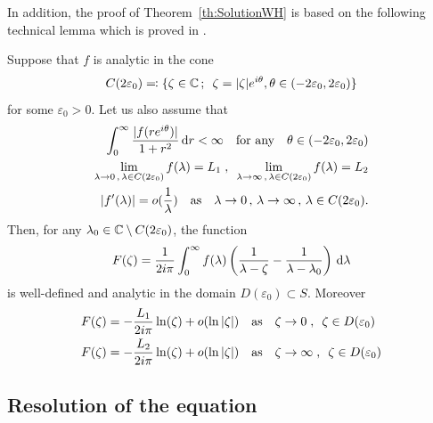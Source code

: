 In addition, the proof of Theorem~\ref{th:SolutionWH} is based on the following technical lemma which is proved in \cite{escobedo2007fundamental}.  
\begin{lemma}
    \label{escoARMA:C.2.}
    Suppose that $f$ is analytic in the cone 
    $$ C(2\varepsilon_0) \eqqcolon \{ \zeta \in \mathbb{C} \,;\,\ \zeta = |\zeta|e^{i\theta}, \theta \in (-2\varepsilon_0, 2\varepsilon_0)\}$$
    for some $\varepsilon_0 > 0$. Let us also assume that 
    \begin{align}
        \label{escoARMA:C5} \int_0^\infty \frac{|f(re^{i \theta})|}{1+r^2} \,\mathrm{d} r < \infty \quad \text{for any} \quad \theta \in (-2\varepsilon_0, 2\varepsilon_0) \\
        \label{escoARMA:C6} \lim_{\lambda \to 0 \,,\, \lambda \in C(2\varepsilon_0)} f(\lambda) = L_1 
        \; , \enspace \lim_{\lambda \to \infty \,,\, \lambda \in C(2\varepsilon_0)} f(\lambda) = L_2 \\
        \label{escoARMA:C7} |f'(\lambda)| = o(\frac1\lambda) \quad \text{as} \quad \lambda \to 0 \,,\,\lambda \to \infty \,,\, \lambda \in C(2\varepsilon_0). 
    \end{align}
    Then, for any $\lambda_0 \in \mathbb{C} \setminus C(2\varepsilon_0)$, the function
    \begin{align}
        \label{escoARMA:C8} F(\zeta) = \frac{1}{2i\pi} \int_0^\infty f(\lambda) \left( \frac{1}{\lambda - \zeta} - \frac{1}{\lambda - \lambda_0}\right) \,\mathrm{d} \lambda
    \end{align} 
    is well-defined and analytic in the domain $D(\varepsilon_0) \subset S$. Moreover
    \begin{align}
        F(\zeta) &= - \frac{L_1}{2i\pi} \ln(\zeta) + o(\ln |\zeta|) \quad \text{as} \quad \zeta \to 0 \; , \enspace \zeta \in D(\varepsilon_0) \\
        F(\zeta) &= - \frac{L_2}{2i\pi} \ln(\zeta) + o(\ln |\zeta|) \quad \text{as} \quad \zeta \to \infty \; , \enspace \zeta \in D(\varepsilon_0)
    \end{align} 
\end{lemma}

\subsection{Resolution of the equation}

